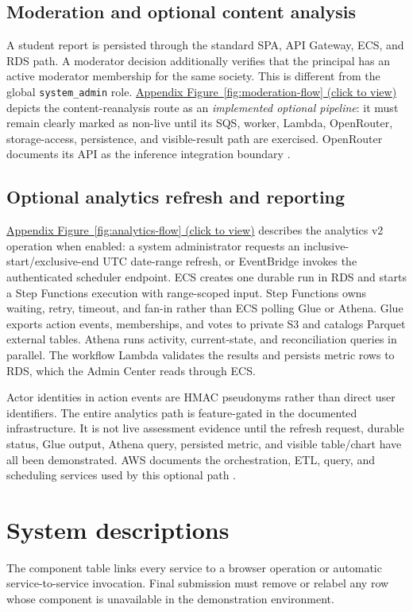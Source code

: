 \documentclass[11pt,a4paper]{article}
\begin{document}
\subsection{Moderation and optional content analysis}
A student report is persisted through the standard SPA, API Gateway, ECS, and RDS path. A moderator decision additionally verifies that the principal has an active moderator membership for the same society. This is different from the global \texttt{system\_admin} role. \hyperref[fig:moderation-flow]{Appendix Figure~\ref*{fig:moderation-flow} (click to view)} depicts the content-reanalysis route as an \emph{implemented optional pipeline}: it must remain clearly marked as non-live until its SQS, worker, Lambda, OpenRouter, storage-access, persistence, and visible-result path are exercised. OpenRouter documents its API as the inference integration boundary \cite{openrouter-api}.


\subsection{Optional analytics refresh and reporting}
\hyperref[fig:analytics-flow]{Appendix Figure~\ref*{fig:analytics-flow} (click to view)} describes the analytics v2 operation when enabled: a system administrator requests an inclusive-start/exclusive-end UTC date-range refresh, or EventBridge invokes the authenticated scheduler endpoint. ECS creates one durable run in RDS and starts a Step Functions execution with range-scoped input. Step Functions owns waiting, retry, timeout, and fan-in rather than ECS polling Glue or Athena. Glue exports action events, memberships, and votes to private S3 and catalogs Parquet external tables. Athena runs activity, current-state, and reconciliation queries in parallel. The workflow Lambda validates the results and persists metric rows to RDS, which the Admin Center reads through ECS.

Actor identities in action events are HMAC pseudonyms rather than direct user identifiers. The entire analytics path is feature-gated in the documented infrastructure. It is not live assessment evidence until the refresh request, durable status, Glue output, Athena query, persisted metric, and visible table/chart have all been demonstrated. AWS documents the orchestration, ETL, query, and scheduling services used by this optional path \cite{aws-stepfunctions,aws-glue,aws-athena,aws-eventbridge}.


\section{System descriptions}
The component table links every service to a browser operation or automatic service-to-service invocation. Final submission must remove or relabel any row whose component is unavailable in the demonstration environment.
\end{document}

